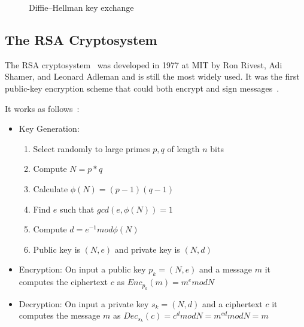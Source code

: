 \begin{figure}[!hb]
  \centering
  \caption{Diffie–Hellman key exchange}
  \label{fig:crypto:dh}
\end{figure}

\subsection{The RSA Cryptosystem}
\label{preliminaries:pub:rsa}

The RSA cryptosystem~\cite{rsa} was developed in 1977 at MIT by Ron Rivest, Adi Shamer, and Leonard Adleman and is still the most widely used. It was the first public-key encryption scheme that could both encrypt and sign messages~\cite{kiagias:crypto}.

It works as follows~\cite{Katz:2014:IMC:2700550, kiagias:crypto}:

\begin{itemize}
  \item Key Generation:
    \begin{enumerate}
      \item Select randomly to large primes $p, q$ of length $n$ bits
      \item Compute $N = p*q$
      \item Calculate $\phi(N) = (p - 1)(q - 1)$
      \item Find $e$ such that $gcd(e, \phi(N)) = 1$
      \item Compute $d = e^{-1} mod\phi(N)$
      \item Public key is $(N, e)$ and private key is $(N, d)$
    \end{enumerate}
  \item Encryption: On input a public key $p_k = (N, e)$ and a message $m$ it computes the ciphertext $c$ as $ Enc_{p_k}(m) = m^{e}modN$
  \item Decryption: On input a private key $s_k = (N, d)$ and a ciphertext $c$ it computes the message $m$ as $ Dec_{s_k}(c) = c^{d}modN = m^{ed}modN = m$
\end{itemize}

